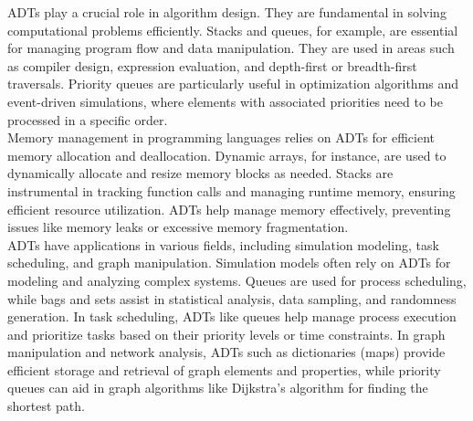 \noindent ADTs play a crucial role in algorithm design. They are fundamental in solving computational problems efficiently. Stacks and queues, for example, are essential for managing program flow and data manipulation.
They are used in areas such as compiler design, expression evaluation, and depth-first or breadth-first traversals. Priority queues are particularly useful in optimization algorithms and event-driven simulations, where
elements with associated priorities need to be processed in a specific order. \\

\noindent Memory management in programming languages relies on ADTs for efficient memory allocation and deallocation. Dynamic arrays, for instance, are used to dynamically allocate and resize memory blocks as needed.
Stacks are instrumental in tracking function calls and managing runtime memory, ensuring efficient resource utilization. ADTs help manage memory effectively, preventing issues like memory leaks or excessive memory 
fragmentation. \\

\noindent ADTs have applications in various fields, including simulation modeling, task scheduling, and graph manipulation. Simulation models often rely on ADTs for modeling and analyzing complex systems. Queues are used
for process scheduling, while bags and sets assist in statistical analysis, data sampling, and randomness generation. In task scheduling, ADTs like queues help manage process execution and prioritize tasks based on their
priority levels or time constraints. In graph manipulation and network analysis, ADTs such as dictionaries (maps) provide efficient storage and retrieval of graph elements and properties, while priority queues can aid in
graph algorithms like Dijkstra's algorithm for finding the shortest path.
